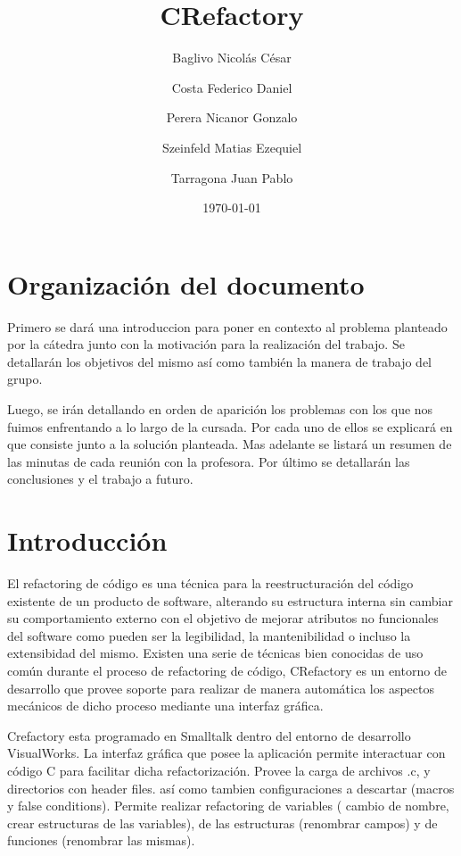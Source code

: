 \documentclass[a4paper,oneside,12pt]{article}
\begin{document}

\title{CRefactory}
\author{Baglivo Nicol\'as C\'esar \and Costa Federico Daniel \and Perera Nicanor Gonzalo \and Szeinfeld Matias Ezequiel \and Tarragona Juan Pablo}
\date{\today}
\maketitle

\tableofcontents

\newpage

\section{Organizaci\'on del documento}
Primero se dará una introduccion para poner en contexto al problema planteado por la c\'atedra junto con la  motivaci\'on para la realizaci\'on del trabajo. Se detallar\'an los objetivos del mismo así como tambi\'en la manera de trabajo del grupo.

Luego, se ir\'an detallando en orden de aparici\'on los problemas con los que nos fuimos enfrentando a lo largo de la cursada. Por cada uno de ellos se explicar\'a en que consiste junto a la soluci\'on planteada.
Mas adelante se listará un resumen de las minutas de cada reunión con la profesora.
Por \'ultimo se detallar\'an las conclusiones y el trabajo a futuro.

\section{Introducción}
El refactoring de c\'odigo es una técnica para la reestructuración del código existente de un producto de software, alterando su estructura interna sin cambiar su comportamiento externo con el objetivo de mejorar atributos no funcionales del software como pueden ser la legibilidad, la mantenibilidad o incluso la extensibidad del mismo. Existen una serie de t\'ecnicas bien conocidas de uso com\'un durante el proceso de refactoring de c\'odigo, CRefactory es un entorno de desarrollo que provee soporte para realizar de manera autom\'atica los aspectos mec\'anicos de dicho proceso mediante una interfaz gr\'afica.

Crefactory esta programado en Smalltalk dentro del entorno de desarrollo VisualWorks. La interfaz gr\'afica que posee la aplicaci\'on permite interactuar con c\'odigo C para facilitar dicha refactorizaci\'on. Provee la carga de archivos .c, y directorios con header files. as\'i como tambien configuraciones a descartar (macros y false conditions).  
Permite realizar refactoring de variables ( cambio de nombre, crear estructuras de las variables), de las estructuras (renombrar campos) y de funciones (renombrar las mismas).
\end{document}
